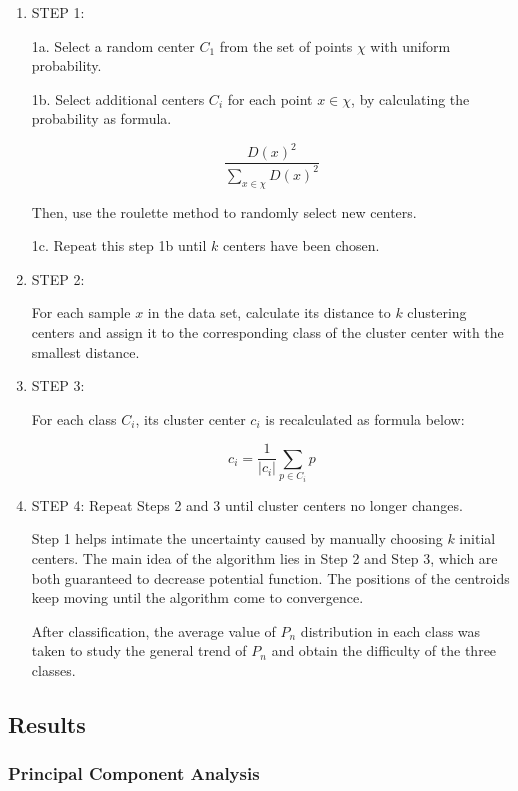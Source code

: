 \documentclass[
  journal=medium,
  manuscript=Report,
  year=2023,
  volume=37,
]{cup-journal}
\begin{document}
\begin{enumerate}
    \item STEP 1: 
    
    1a. Select a random center $C_1$ from the set of points $\chi$ with uniform probability.
    
    1b. Select additional centers $C_i$ for each point $x\in\chi$, by calculating the probability as formula.
    
    $$\frac{D(x)^2}{\sum_{x\in\chi}D(x)^2}$$
    
    Then, use the roulette method to randomly select new centers. 
    
    1c. Repeat this step 1b until $k$ centers have been chosen. 

    \item STEP 2:
    
    For each sample $x$ in the data set, calculate its distance to $k$ clustering centers and assign it to the corresponding class of the cluster center with the smallest distance. 

    \item STEP 3:
    
    For each class $C_i$, its cluster center $c_i$ is recalculated as formula below:
    
    $$c_i = \frac{1}{|c_i|}\sum_{p \in C_i}p$$

    \item STEP 4:
    Repeat Steps 2 and 3 until cluster centers no longer changes.
    
    Step 1 helps intimate the uncertainty caused by manually choosing $k$ initial centers. The main idea of the algorithm lies in Step 2 and Step 3, which are both guaranteed to decrease potential function. The positions of the centroids keep moving until the algorithm come to convergence.

    After classification, the average value of $P_n$ distribution in each class was taken to study the general trend of $P_n$ and obtain the difficulty of the three classes.
\end{enumerate}

\subsection{Results}
\subsubsection{Principal Component Analysis}
\end{document}
